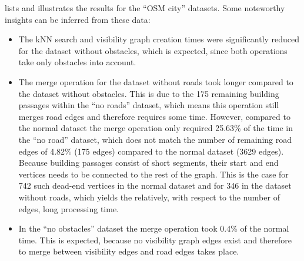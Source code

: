 			 lists and illustrates the results for the \enquote{OSM city} datasets.
			Some noteworthy insights can be inferred from these data:
			\begin{itemize}
				\item The kNN search and visibility graph creation times were significantly reduced for the dataset without obstacles, which is expected, since both operations take only obstacles into account.
				\item The merge operation for the dataset without roads took longer compared to the dataset without obstacles.
				This is due to the 175 remaining building passages within the \enquote{no roads} dataset, which means this operation still merges road edges and therefore requires some time.
				However, compared to the normal dataset the merge operation only required 25.63\% of the time in the \enquote{no road} dataset, which does not match the number of remaining road edges of 4.82\% (175 edges) compared to the normal dataset (3629 edges).
				Because building passages consist of short segments, their start and end vertices needs to be connected to the rest of the graph.
				This is the case for 742 such dead-end vertices in the normal dataset and for 346 in the dataset without roads, which yields the relatively, with respect to the number of edges, long processing time.
				\item In the \enquote{no obstacles} dataset the merge operation took 0.4\% of the normal time. This is expected, because no visibility graph edges exist and therefore to merge between visibility edges and road edges takes place.
			\end{itemize}
			

